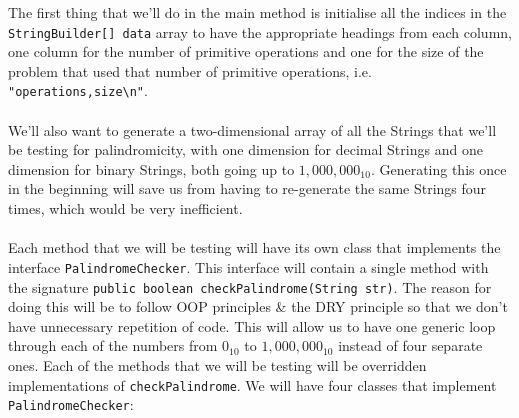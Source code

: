 \documentclass[a4paper]{article}
\begin{document}
The first thing that we'll do in the main method is initialise all the indices in the \verb|StringBuilder[] data| array to have the appropriate headings from each column, one column for the number of primitive operations 
and one for the size of the problem that used that number of primitive operations, i.e. \verb|"operations,size\n"|.
\\\\
We'll also want to generate a two-dimensional array of all the Strings that we'll be testing for palindromicity, with one dimension for decimal Strings and one dimension for binary Strings, both going up to 
$1,000,000_{10}$.
Generating this once in the beginning will save us from having to re-generate the same Strings four times, which would be very inefficient.
\\\\
Each method that we will be testing will have its own class that implements the interface \verb|PalindromeChecker|. 
This interface will contain a single method with the signature \verb|public boolean checkPalindrome(String str)|. 
The reason for doing this will be to follow OOP principles \& the DRY principle so that we don't have unnecessary repetition of code. 
This will allow us to have one generic loop through each of the numbers from $0_{10}$ to $1,000,000_{10}$ instead of four separate ones.
Each of the methods that we will be testing will be overridden implementations of \verb|checkPalindrome|. 
We will have four classes that implement \verb|PalindromeChecker|:
\end{document}
